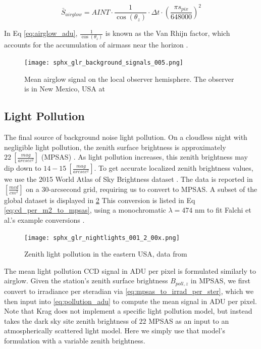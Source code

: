 \begin{equation} \label{eq:airglow_adu}
  \bar{S}_{airglow} = AINT \cdot \frac{1}{\cos(\theta_z)} \cdot \Delta t \cdot \left( \frac{\pi s_{pix}}{648000} \right)^2
\end{equation}

In Eq \ref{eq:airglow_adu}, $\frac{1}{\cos(\theta_z)}$ is known as the Van Rhijn factor, which
accounts for the accumulation of airmass near the horizon \cite{frueh2019notes}.

\begin{figure}[ht]
  \centering
  \texttt{[image: sphx\_glr\_background\_signals\_005.png]}
  \caption{Mean airglow signal on the local observer hemisphere. The observer is in New Mexico, USA at
  \pogslla}
  \label{fig:airglowhemi}
\end{figure}

\subsection{Light Pollution}

The final source of background noise light pollution. On a cloudless night with negligible light
pollution, the zenith surface brightness is approximately $22 \: \left[ \frac{mag}{arcsec^2}
\right]$ (MPSAS) \cite{krag2003}. As light pollution increases, this zenith brightness may dip down to
$14-15 \: \left[ \frac{mag}{arcsec^2} \right]$. To get accurate localized zenith brightness values,
we use the 2015 World Atlas of Sky Brightness dataset \cite{falchi2016_data}. The data is reported in $\left[
	\frac{mcd}{cm^2} \right]$ on a 30-arcsecond grid, requiring us to convert to MPSAS. A subset of the global dataset is displayed in \ref{fig:pollution_data} This conversion is listed in Eq \ref{eq:cd_per_m2_to_mpsas}, using a monochromatic $\lambda = 474$ nm to fit Falchi et al.'s example conversions \cite{falchi2016}.  

\begin{figure}[ht]
  \centering
  \texttt{[image: sphx\_glr\_nightlights\_001\_2\_00x.png]}
  \caption{Zenith light pollution in the eastern USA, data from \cite{falchi2016_data}}
  \label{fig:pollution_data}
\end{figure}

The mean light pollution CCD signal in ADU per pixel is formulated similarly to airglow. Given the station's zenith surface brightness $B_{poll,z}$ in MPSAS, we first convert to irradiance per steradian via \ref{eq:mpsas_to_irrad_per_ster}, which we then input into \ref{eq:pollution_adu} to compute the mean signal in ADU per pixel. Note that Krag does not implement a specific light pollution model, but instead takes the dark sky site zenith brightness of $22$ MPSAS as an input to an atmospherically scattered light model. Here we simply use that model's formulation with a variable zenith brightness.
 
